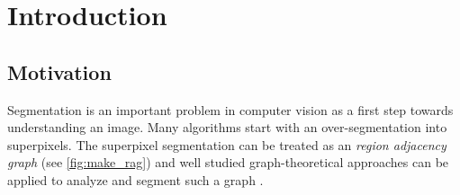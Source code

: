 \chapter{Introduction}\label{main_introduction}


\section{Motivation}
Segmentation is an important problem in computer vision as a first step
towards understanding an image. Many algorithms start with an over-segmentation
into superpixels.
The superpixel segmentation can be treated as an \emph{region adjacency graph} (see \cref{fig:make_rag}) and
well studied graph-theoretical approaches can be applied to analyze and segment such a graph \cite{vlachos_1993_csv}.










